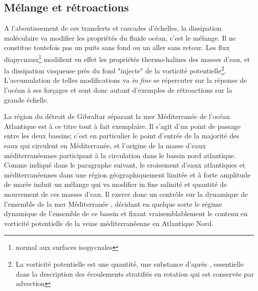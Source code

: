 \subsection{Mélange et rétroactions}
\label{subsection_retroactions}

A l'aboutissement de ces transferts et cascades d'échelles, la dissipation moléculaire va modifier les propriétés du fluide océan, c'est le mélange.
Il ne constitue toutefois pas un puits sans fond ou un aller sans retour. Les flux diapycnaux\footnote{normal aux surfaces isopycnales} modifient en effet les propriétés thermo-halines des masses d'eau, et la dissipation visqueuse près du fond "injecte" de la vorticité potentielle\footnote{La vorticité potentielle est une quantité, une substance d'après \cite{haynes_conservation_1990}, essentielle dans la description des écoulements stratifiés en rotation qui est conservée par advection}. L'accumulation de telles modifications va \textit{in fine} se répercuter sur la réponse de l'océan à ses forçages et sont donc autant d'exemples de rétroactions sur la grande échelle.



La région du détroit de Gibraltar séparant la mer Méditerranée de l'océan Atlantique est à ce titre tout à fait exemplaire. Il s'agit d'un point de passage entre les deux bassins; c'est en particulier le point d'entrée de la majorité des eaux qui circulent en Méditerranée, et l'origine de la masse d'eaux méditerranéennes participant à la circulation dans le bassin nord atlantique. Comme indiqué dans le paragraphe suivant, le croisement d'eaux atlantiques et méditerranéennes dans une région géographiquement limitée et à forte amplitude de marée induit un mélange qui va modifier in fine salinité et quantité de mouvement de ces masses d'eau. Il exerce donc un contrôle sur la dynamique de l'ensemble de la mer Méditerranée \citep{FA1988}, décidant en quelque sorte le régime dynamique de l'ensemble de ce bassin et fixant vraisemblablement le contenu en vorticité potentielle de la veine méditerranéenne en Atlantique Nord.\\


